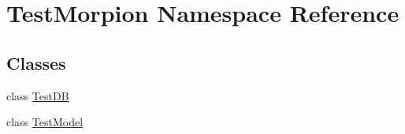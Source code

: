 \hypertarget{namespace_test_morpion}{}\section{Test\+Morpion Namespace Reference}
\label{namespace_test_morpion}
\subsection*{Classes}
\begin{DoxyCompactItemize}
\item 
class \hyperlink{class_test_morpion_1_1_test_d_b}{Test\+DB}
\item 
class \hyperlink{class_test_morpion_1_1_test_model}{Test\+Model}
\end{DoxyCompactItemize}
